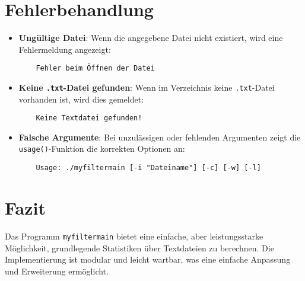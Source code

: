 \documentclass[10pt]{article} %
\begin{document}
\section{Fehlerbehandlung}
\begin{itemize}
    \item \textbf{Ungültige Datei}: Wenn die angegebene Datei nicht existiert, wird eine Fehlermeldung angezeigt:
    \begin{verbatim}
    Fehler beim Öffnen der Datei
    \end{verbatim}
    \item \textbf{Keine \texttt{.txt}-Datei gefunden}: Wenn im Verzeichnis keine \texttt{.txt}-Datei vorhanden ist, wird dies gemeldet:
    \begin{verbatim}
    Keine Textdatei gefunden!
    \end{verbatim}
    \item \textbf{Falsche Argumente}: Bei unzulässigen oder fehlenden Argumenten zeigt die \texttt{usage()}-Funktion die korrekten Optionen an:
    \begin{verbatim}
    Usage: ./myfiltermain [-i "Dateiname"] [-c] [-w] [-l]
    \end{verbatim}
\end{itemize}

\section{Fazit}
Das Programm \texttt{myfiltermain} bietet eine einfache, aber leistungsstarke Möglichkeit, grundlegende Statistiken über Textdateien zu berechnen. Die Implementierung ist modular und leicht wartbar, was eine einfache Anpassung und Erweiterung ermöglicht.
\end{document}
